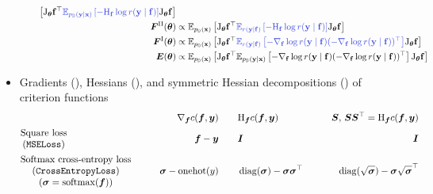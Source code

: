 \begin{itemize}
\begin{itemize}
\begin{align*}
        \left[
        \jac_{\vtheta} \rvf^{\top}
        \textcolor{VectorBlue}{
        \E_{p_{\sD}(\rvy \mid \rvx)}
        \left[
        -\hess_{\rvf} \log r(\rvy \mid \rvf)
        \right]
        }
        \jac_{\vtheta} \rvf
        \right]
      \\
      \mF^{\text{II}}(\vtheta)
      &\propto
        \E_{p_{\sD}(\rvx)}
        \left[
        \jac_{\vtheta} \rvf^{\top}
        \textcolor{VectorBlue}{
        \E_{r(\rvy \mid \rvf)}
        \left[
        -\hess_{\rvf} \log r(\rvy \mid \rvf)
        \right]
        }
        \jac_{\vtheta} \rvf
        \right]
      \\
      \mF^{\text{I}}(\vtheta)
      &\propto
        \E_{p_{\sD}(\rvx)}
        \left[
        \jac_{\vtheta} \rvf^{\top}
        \textcolor{VectorBlue}{
        \E_{r(\rvy \mid \rvf)}
        \left[
        -\nabla_{\rvf} \log r(\rvy \mid \rvf)
        (
        -\nabla_{\rvf} \log r(\rvy \mid \rvf)
        )^{\top}
        \right]
        }
        \jac_{\vtheta} \rvf
        \right]
      \\
      \mE(\vtheta)
      &\propto
        \E_{p_{\sD}(\rvx)}
        \left[
        \jac_{\vtheta} \rvf^{\top}
        \E_{p_{\sD}(\rvy \mid \rvx)}
        \left[
        -\nabla_{\rvf} \log r(\rvy \mid \rvf)
        (
        -\nabla_{\rvf} \log r(\rvy \mid \rvf)
        )^{\top}
        \right]
        \jac_{\vtheta} \rvf
        \right]
    \end{align*}
  \end{itemize}
\item Gradients (), Hessians (), and symmetric Hessian decompositions () of criterion functions
  \begin{align*}
    &
      \qquad&\nabla_{{\bm{f}}} c({\bm{f}}, {\bm{y}})
              \qquad&\mathrm{H}_{{\bm{f}}} c({\bm{f}}, {\bm{y}})
                      \qquad&{\bm{S}},\, {\bm{S}} {\bm{S}}^{\top} = \mathrm{H}_{{\bm{f}}} c({\bm{f}}, {\bm{y}})
    \\
    &
      \begin{matrix}
        \text{Square loss}\\
        \text{(\texttt{MSELoss})}
      \end{matrix}
    & {\bm{f}} - {\bm{y}}
      \qquad& {\bm{I}}
              \qquad& {\bm{I}}
    \\
    &
      \begin{matrix}
        \text{Softmax cross-entropy loss}\\
        (\text{\texttt{CrossEntropyLoss}})\\
        ({\bm{\sigma}} = \mathrm{softmax}({\bm{f}}))
      \end{matrix}
      \qquad& {\bm{\sigma}} - \mathrm{onehot}(y)
              \qquad& \operatorname{diag}({\bm{\sigma}}) - {\bm{\sigma}} {\bm{\sigma}}^{\top}
                      \qquad& \operatorname{diag}(\sqrt{{\bm{\sigma}}}) - {\bm{\sigma}} \sqrt{{\bm{\sigma}}}^{\top}
  \end{align*}
\end{itemize}
